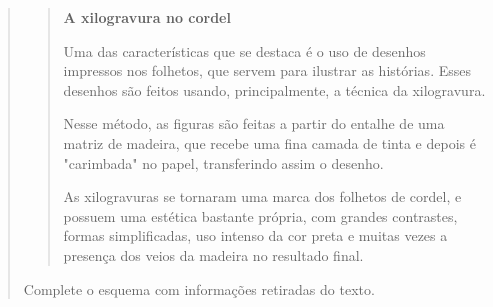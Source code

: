 \begin{quote}
\begin{quote}
\textbf{A xilogravura no cordel}

Uma das características que se destaca é o uso de desenhos impressos nos
folhetos, que servem para ilustrar as histórias. Esses desenhos são
feitos usando, principalmente, a técnica da xilogravura.

Nesse método, as figuras são feitas a partir do entalhe de uma matriz de
madeira, que recebe uma fina camada de tinta e depois é "carimbada" no
papel, transferindo assim o desenho.

As xilogravuras se tornaram uma marca dos folhetos de cordel, e possuem
uma estética bastante própria, com grandes contrastes, formas
simplificadas, uso intenso da cor preta e muitas vezes a presença dos
veios da madeira no resultado final.

\end{quote}


Complete o esquema com informações retiradas do texto.


\end{quote}
